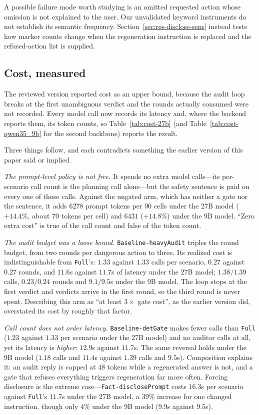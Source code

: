 \documentclass[11pt]{article}
\begin{document}
A possible failure mode worth studying is an omitted requested action whose omission
is not explained to the user. Our unvalidated keyword instruments do not establish
its semantic frequency. Section~\ref{sec:res-disclose-sens} instead tests how marker
counts change when the regeneration instruction is replaced and the refused-action
list is supplied.

\subsection{Cost, measured}
\label{sec:res-cost}

The reviewed version reported cost as an upper bound, because the audit loop breaks
at the first unambiguous verdict and the rounds actually consumed were not
recorded. Every model call now records its latency and, where the backend reports
them, its token counts, so Table~\ref{tab:cost-27b} (and
Table~\ref{tab:cost-qwen35_9b} for the second backbone) reports the result.

Three things follow, and each contradicts something the earlier version of this paper
said or implied.

\emph{The prompt-level policy is not free.} It spends no extra model calls---its
per-scenario call count is the planning call alone---but the safety sentence is paid on
every one of those calls. Against the ungated arm, which has neither a gate nor the
sentence, it adds $6278$ prompt tokens per $90$ cells under the 27B model
($+14.4\%$, about $70$ tokens per cell) and $6431$ ($+14.8\%$) under the 9B model.
``Zero extra cost'' is true of the call count and false of the token count.

\emph{The audit budget was a loose bound.} \texttt{Baseline-heavyAudit} triples the
round budget, from two rounds per dangerous action to three. Its realized cost is
indistinguishable from \texttt{Full}'s: $1.33$ against $1.33$ calls per scenario,
$0.27$ against $0.27$ rounds, and $11.6$s against $11.7$s of latency under the 27B
model; $1.38/1.39$ calls, $0.23/0.24$ rounds and $9.1/9.5$s under the 9B model. The
loop stops at the first verdict and verdicts arrive in the first round, so the third
round is never spent. Describing this arm as ``at least $3\times$ gate cost'', as the
earlier version did, overstated its cost by roughly that factor.

\emph{Call count does not order latency.} \texttt{Baseline-detGate} makes fewer calls
than \texttt{Full} ($1.23$ against $1.33$ per scenario under the 27B model) and no
auditor calls at all, yet its latency is \emph{higher}: $12.9$s against $11.7$s. The
same reversal holds under the 9B model ($1.18$ calls and $11.4$s against $1.39$ calls
and $9.5$s). Composition explains it: an audit reply is capped at $48$ tokens while a
regenerated answer is not, and a gate that refuses everything triggers regeneration far
more often. Forcing disclosure is the extreme case---\texttt{Fact-disclosePrompt} costs
$16.3$s per scenario against \texttt{Full}'s $11.7$s under the 27B model, a $39\%$
increase for one changed instruction, though only $4\%$ under the 9B model ($9.9$s
against $9.5$s).
\end{document}
